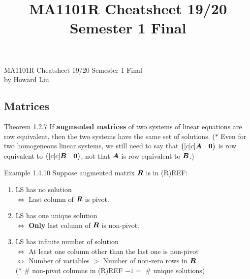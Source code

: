 \documentclass[10pt,portrait]{article}
\title{MA1101R Cheatsheet 19/20 Semester 1 Final}
\begin{document}
\begin{center}
{\large MA1101R Cheatsheet 19/20 Semester 1 Final}\\{by Howard Liu}
\end{center}

\footnotesize

\begin{multicols}{2}
\begin{justifying}

\setlength{\premulticols}{1pt}
\setlength{\postmulticols}{1pt}
\setlength{\multicolsep}{1pt}
\setlength{\columnsep}{2pt}

\section{Matrices}

\begin{namedthm*}{Theorem 1.2.7}
	If \textbf{augmented matrices} of two systems of linear equations are row equivalent, then the two systems have the same set of solutions. (\(\ast\) Even for two homogeneous linear systems, we still need to say that \(\begin{pmatrix}[c|c]\bm{A} & \bm{0}\end{pmatrix}\) is row equivalent to \(\begin{pmatrix}[c|c]\bm{B} & \bm{0}\end{pmatrix}\), not that \(\bm{A}\) is row equivalent to \(\bm{B}\).)
\end{namedthm*}

\begin{namedthm*}{Example 1.4.10}
	Suppose augmented matrix \(\bm{R}\) is in (R)REF:
	\begin{enumerate}
		\item LS has no solution \\
		    \(\Leftrightarrow\) Last column of \(\bm{R}\) is pivot.
		\item LS has one unique solution \\
		    \(\Leftrightarrow\) \textbf{Only} last column of \(\bm{R}\) is non-pivot.
		\item LS has infinite number of solution \\
		    \(\Leftrightarrow\) At least one column other than the last one is non-pivot \\
		    \(\Leftrightarrow\) Number of variables $>$ Number of non-zero rows in \(\bm{R}\) \\
		(\(\ast\) \# non-pivot columns in (R)REF \(- 1 =\) \# unique solutions)
	\end{enumerate}
\end{namedthm*}


\end{justifying}
\end{multicols}
\end{document}

